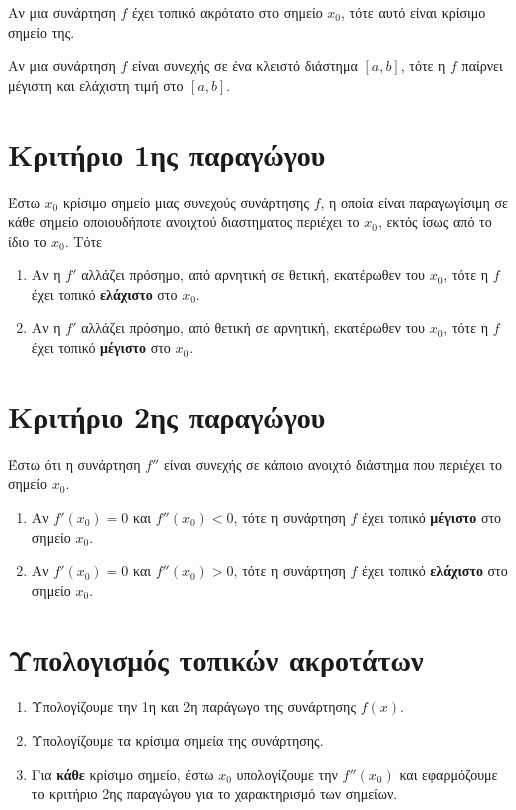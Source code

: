 \begin{prop}
  Αν μια συνάρτηση $f$ έχει τοπικό ακρότατο στο σημείο $ x_{0} $, τότε αυτό είναι κρίσιμο
  σημείο της.
\end{prop}

\begin{thm}
  Αν μια συνάρτηση $f$ είναι συνεχής σε ένα κλειστό διάστημα $ [a,b] $, τότε η $f$
  παίρνει μέγιστη και ελάχιστη τιμή στο $ [a,b] $.
\end{thm}

\section*{Κριτήριο 1ης παραγώγου}
Έστω $ x_{0} $ κρίσιμο σημείο μιας συνεχούς συνάρτησης $f$, η οποία είναι 
παραγωγίσιμη σε κάθε σημείο οποιουδήποτε ανοιχτού διαστηματος περιέχει το $ x_{0} $, 
εκτός ίσως από το ίδιο το $ x_{0} $. Τότε
\begin{enumerate}
  \item Αν η $f'$ αλλάζει πρόσημο, από αρνητική σε θετική, εκατέρωθεν του $ x_{0} $, 
    τότε η $f$ έχει τοπικό \textbf{ελάχιστο} στο $ x_{0} $.
  \item Αν η $f'$ αλλάζει πρόσημο, από θετική σε αρνητική, εκατέρωθεν του $ x_{0} $, 
    τότε η $f$ έχει τοπικό \textbf{μέγιστο} στο $ x_{0} $.
\end{enumerate}

\section*{Κριτήριο 2ης παραγώγου}
Έστω ότι η συνάρτηση $ f'' $ είναι συνεχής σε κάποιο ανοιχτό διάστημα που περιέχει 
το σημείο $ x_{0} $.

\begin{enumerate}
  \item Αν $ f'(x_{0}) = 0 $ και $ f''(x_{0}) < 0 $, τότε η συνάρτηση $f$ έχει 
    τοπικό \textbf{μέγιστο} στο σημείο $ x_{0} $.
  \item Αν $ f'(x_{0}) = 0 $ και $ f''(x_{0}) > 0 $, τότε η συνάρτηση $f$ έχει 
    τοπικό \textbf{ελάχιστο} στο σημείο $ x_{0} $.
\end{enumerate}

\section*{Υπολογισμός τοπικών ακροτάτων}
\begin{enumerate}
  \item Υπολογίζουμε την 1η και 2η παράγωγο της συνάρτησης $ f(x) $.
  \item Υπολογίζουμε τα κρίσιμα σημεία της συνάρτησης.
  \item Για \textbf{κάθε} κρίσιμο σημείο, έστω $ x_{0} $ υπολογίζουμε την 
    $ f''(x_{0}) $ και εφαρμόζουμε το κριτήριο 2ης παραγώγου για το χαρακτηρισμό των 
    σημείων.
\end{enumerate}

